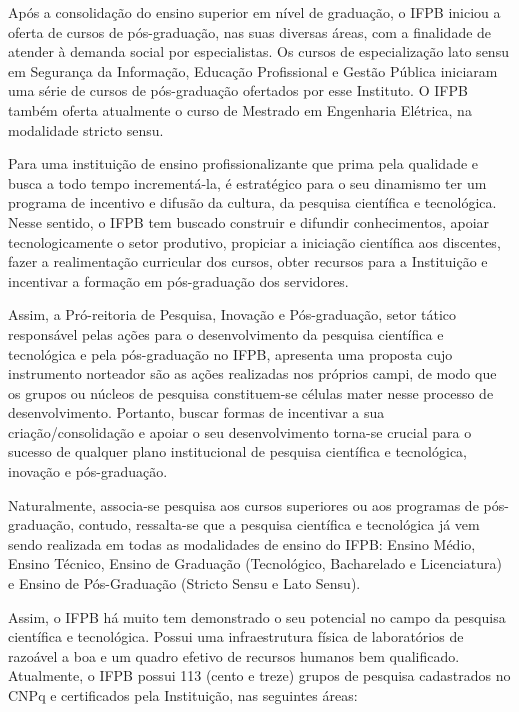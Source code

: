 	Após a consolidação do ensino superior em nível de graduação, o IFPB iniciou a oferta de cursos de pós-graduação, nas suas diversas áreas, com a finalidade de atender à demanda social por especialistas. Os cursos de especialização lato sensu em Segurança da Informação, Educação Profissional e Gestão Pública iniciaram uma série de cursos de pós-graduação ofertados por esse Instituto. O IFPB também oferta atualmente o curso de Mestrado em Engenharia Elétrica, na modalidade stricto sensu.
	
	Para uma instituição de ensino profissionalizante que prima pela qualidade e busca a todo tempo incrementá-la, é estratégico para o seu dinamismo ter um programa de incentivo e difusão da cultura, da pesquisa científica e tecnológica. Nesse sentido, o IFPB tem buscado construir e difundir conhecimentos, apoiar tecnologicamente o setor produtivo, propiciar a iniciação científica aos discentes, fazer a realimentação curricular dos cursos, obter recursos para a Instituição e incentivar a formação em pós-graduação dos servidores.
	
	Assim, a Pró-reitoria de Pesquisa, Inovação e Pós-graduação, setor tático responsável pelas ações para o desenvolvimento da pesquisa científica e tecnológica e pela pós-graduação no IFPB, apresenta uma proposta cujo instrumento norteador são as ações realizadas nos próprios campi, de modo que os grupos ou núcleos de pesquisa constituem-se células mater nesse processo de desenvolvimento. Portanto, buscar formas de incentivar a sua criação/consolidação e apoiar o seu desenvolvimento torna-se crucial para o sucesso de qualquer plano institucional de pesquisa científica e tecnológica, inovação e pós-graduação.
	
	Naturalmente, associa-se pesquisa aos cursos superiores ou aos programas de pós-graduação, contudo, ressalta-se que a pesquisa científica e tecnológica já vem sendo realizada em todas as modalidades de ensino do IFPB: Ensino Médio, Ensino Técnico, Ensino de Graduação (Tecnológico, Bacharelado e Licenciatura) e Ensino de Pós-Graduação (Stricto Sensu e Lato Sensu).
	
	Assim, o IFPB há muito tem demonstrado o seu potencial no campo da pesquisa científica e tecnológica. Possui uma infraestrutura física de laboratórios de razoável a boa e um quadro efetivo de recursos humanos bem qualificado. Atualmente, o IFPB possui 113 (cento e treze) grupos de pesquisa cadastrados no CNPq e certificados pela Instituição, nas seguintes áreas: 
	
